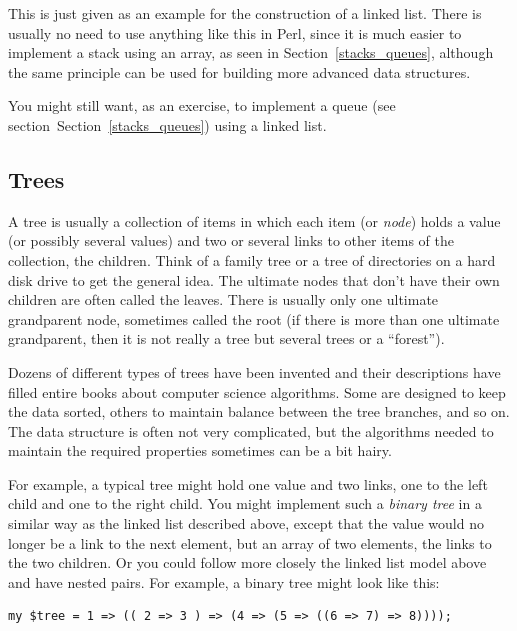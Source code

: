 This is just given as an example for the construction of a 
linked list. There is usually no need to use anything like 
this in Perl, since it is much easier to implement 
a stack using an array, as seen in Section~\ref{stacks_queues}, 
although the same principle can be used for building more 
advanced data structures.

You might still want, as an exercise, to implement a queue 
(see section~Section~\ref{stacks_queues}) using a linked list. 

\subsection{Trees}
\label{tree}

A tree is usually a collection of items in which each 
item (or \emph{node}) holds a value (or possibly 
several values) and two or several 
links to other items of the collection, the children. Think 
of a family tree or a tree of directories on a hard disk 
drive to get the general idea. The ultimate 
nodes that don't have their own children are often called 
the leaves. There is usually only one ultimate grandparent 
node, sometimes called the root (if there is more than one 
ultimate grandparent, then it is not really a tree but 
several trees or a ``forest'').

Dozens of different types of trees have been invented and 
their descriptions have filled entire books about computer 
science algorithms. Some are designed 
to keep the data sorted, others to maintain balance between 
the tree branches, and so on. The data structure is often 
not very complicated, but the algorithms needed to maintain the 
required properties sometimes can be a bit hairy.

For example, a 
typical tree might hold one value and two links, one to 
the left child and one to the right child. You 
might implement such a \emph{binary tree} in a similar way as the 
linked list described above, except that the value 
would no longer be a link to the next element, but an 
array of two elements, the links to the two children. 
Or you could follow more closely the linked list model 
above and have nested pairs. For example, a binary tree 
might look like this:

\begin{verbatim}
my $tree = 1 => (( 2 => 3 ) => (4 => (5 => ((6 => 7) => 8))));
\end{verbatim}

